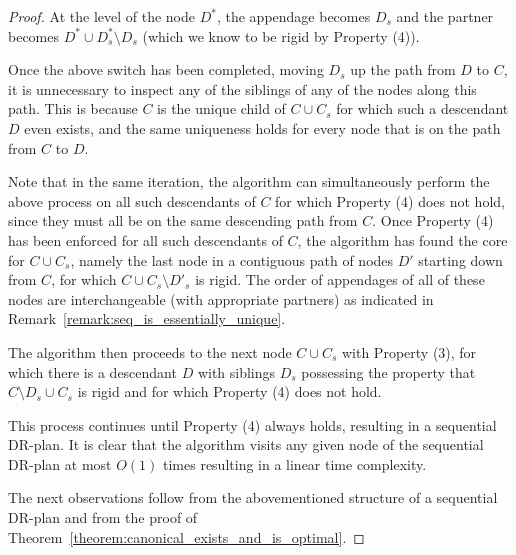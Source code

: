 \begin{proof}
    At the level of the node $D^*$, the appendage becomes $D_s$ and the partner becomes $D^*\cup D^*_s\setminus D_s$ (which we know to be rigid by Property (4)).

    Once the above switch has been completed, moving $D_s$ up the path from $D$ to $C$,
    it is unnecessary to inspect any of the siblings of any of the nodes along this path. This is because $C$ is the unique child of $C\cup C_s$ for which such a descendant $D$ even exists, and the same uniqueness holds for every node that is on the path from $C$ to $D$.

    Note that in the same iteration, the algorithm can simultaneously perform the above process on all such descendants of $C$ for which Property (4) does not hold, since they must all be on the same descending path from $C$. Once Property (4) has been enforced for all such descendants of $C$, the algorithm has found the core for $C\cup C_s$, namely the last node in a contiguous path of nodes $D'$ starting down from $C$, for which $C\cup C_s\setminus D'_s$ is rigid. The order of appendages of all of these nodes are interchangeable (with appropriate partners) as indicated in Remark~\ref{remark:seq_is_essentially_unique}.

    The algorithm then proceeds to the next node $C\cup C_s$ with Property (3), for which there is a descendant $D$ with siblings $D_s$ possessing the property that $C\setminus D_s \cup C_s$ is rigid and for which Property (4) does not hold.

    This process continues until Property (4) always holds, resulting in a sequential DR-plan. It is clear that the algorithm visits any given node of the sequential DR-plan at most $O(1)$ times resulting in a linear time complexity.

    The next observations follow from the abovementioned structure of a sequential DR-plan and from the proof of Theorem~\ref{theorem:canonical_exists_and_is_optimal}.
\end{proof}






